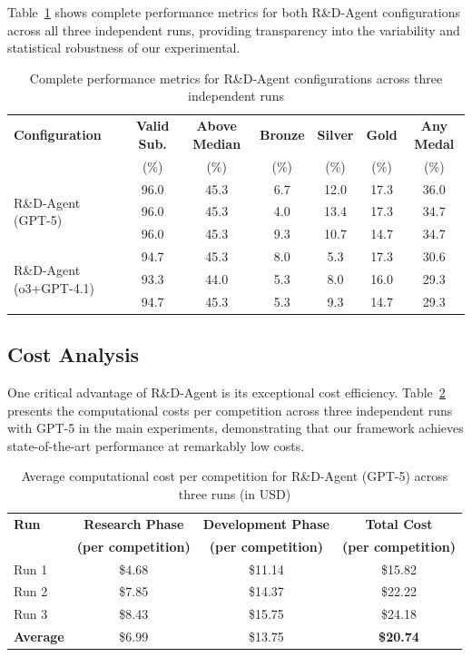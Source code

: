 Table~\ref{tab:detailed_performance_breakdown} shows complete performance metrics for both R\&D-Agent configurations across all three independent runs, providing transparency into the variability and statistical robustness of our experimental.

\begin{table}[htbp]
\centering
\caption{Complete performance metrics for R\&D-Agent configurations across three independent runs}
\label{tab:detailed_performance_breakdown}
\small
\renewcommand{\arraystretch}{1.2}
\begin{tabularx}{\textwidth}{X c c c c c c}
\toprule
\textbf{Configuration} &
\textbf{Valid Sub.} &
\textbf{Above Median} &
\textbf{Bronze} &
\textbf{Silver} &
\textbf{Gold} &
\textbf{Any Medal} \\
& (\%) & (\%) & (\%) & (\%) & (\%) & (\%) \\
\midrule
\multirow{3}{*}{R\&D-Agent (GPT-5)} 
& 96.0 & 45.3 & 6.7 & 12.0 & 17.3 & 36.0 \\
& 96.0 & 45.3 & 4.0 & 13.4 & 17.3 & 34.7 \\
& 96.0 & 45.3 & 9.3 & 10.7 & 14.7 & 34.7 \\
\midrule
\multirow{3}{*}{R\&D-Agent (o3+GPT-4.1)} 
& 94.7 & 45.3 & 8.0 & 5.3 & 17.3 & 30.6 \\
& 93.3 & 44.0 & 5.3 & 8.0 & 16.0 & 29.3 \\
& 94.7 & 45.3 & 5.3 & 9.3 & 14.7 & 29.3 \\
\bottomrule
\end{tabularx}
\end{table}

\subsection{Cost Analysis}

One critical advantage of R\&D-Agent is its exceptional cost efficiency. Table~\ref{tab:cost_analysis} presents the computational costs per competition across three independent runs with GPT-5 in the main experiments, demonstrating that our framework achieves state-of-the-art performance at remarkably low costs.

\begin{table}[htbp]
\centering
\caption{Average computational cost per competition for R\&D-Agent (GPT-5) across three runs (in USD)}
\label{tab:cost_analysis}
\renewcommand{\arraystretch}{1.2}
\begin{tabular}{lccc}
\toprule
\textbf{Run} & \textbf{Research Phase} & \textbf{Development Phase} & \textbf{Total Cost} \\
& \textbf{(per competition)} & \textbf{(per competition)} & \textbf{(per competition)} \\
\midrule
Run 1 & \$4.68 & \$11.14 & \$15.82 \\
Run 2 & \$7.85 & \$14.37 & \$22.22 \\
Run 3 & \$8.43 & \$15.75 & \$24.18 \\
\midrule
\textbf{Average} & \$6.99 & \$13.75 & \textbf{\$20.74} \\
\bottomrule
\end{tabular}
\end{table}

